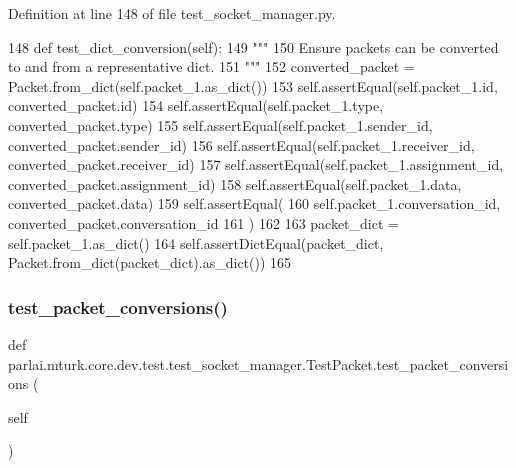 Definition at line 148 of file test\+\_\+socket\+\_\+manager.\+py.


\begin{DoxyCode}
148     \textcolor{keyword}{def }test\_dict\_conversion(self):
149         \textcolor{stringliteral}{"""}
150 \textcolor{stringliteral}{        Ensure packets can be converted to and from a representative dict.}
151 \textcolor{stringliteral}{        """}
152         converted\_packet = Packet.from\_dict(self.packet\_1.as\_dict())
153         self.assertEqual(self.packet\_1.id, converted\_packet.id)
154         self.assertEqual(self.packet\_1.type, converted\_packet.type)
155         self.assertEqual(self.packet\_1.sender\_id, converted\_packet.sender\_id)
156         self.assertEqual(self.packet\_1.receiver\_id, converted\_packet.receiver\_id)
157         self.assertEqual(self.packet\_1.assignment\_id, converted\_packet.assignment\_id)
158         self.assertEqual(self.packet\_1.data, converted\_packet.data)
159         self.assertEqual(
160             self.packet\_1.conversation\_id, converted\_packet.conversation\_id
161         )
162 
163         packet\_dict = self.packet\_1.as\_dict()
164         self.assertDictEqual(packet\_dict, Packet.from\_dict(packet\_dict).as\_dict())
165 
\end{DoxyCode}
\mbox{\label{classparlai_1_1mturk_1_1core_1_1dev_1_1test_1_1test__socket__manager_1_1TestPacket_a49f0b9a81a957f320143fec13a6455dc}} 
\subsubsection{\texorpdfstring{test\+\_\+packet\+\_\+conversions()}{test\_packet\_conversions()}}
{\footnotesize\ttfamily def parlai.\+mturk.\+core.\+dev.\+test.\+test\+\_\+socket\+\_\+manager.\+Test\+Packet.\+test\+\_\+packet\+\_\+conversions (\begin{DoxyParamCaption}\item[{}]{self }\end{DoxyParamCaption})}

